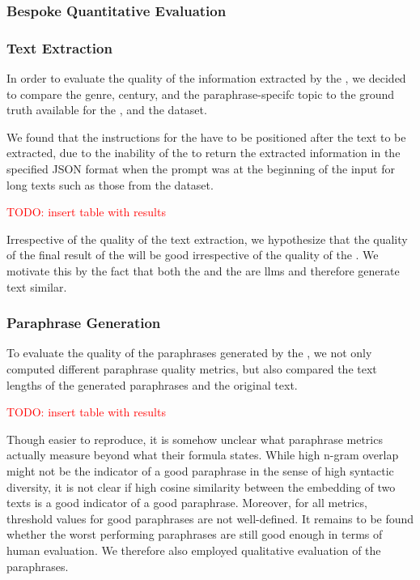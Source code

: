 

\subsubsection{Bespoke Quantitative Evaluation}
\label{subsec:custom_quantitative_evaluation}

\subsubsection{Text Extraction}
\label{subsec:text_extraction}

In order to evaluate the quality of the information extracted by the \pextractor{}, 
we decided to compare the genre, century, and the paraphrase-specifc topic to the 
ground truth available for the \dataBlog{}, \dataGutenberg{} and the \dataCustom{} dataset.

We found that the instructions for the \pextractor{} have to be positioned after the text to be extracted, 
due to the inability of the \pextractor{} to return the extracted information in the specified JSON format 
when the prompt was at the beginning of the input for long texts such as those from the \dataGutenberg{} dataset.

\textcolor{red}{TODO: insert table with results}

Irrespective of the quality of the text extraction, we hypothesize that the quality of the final result of the \pgenerator{} will be good irrespective of the quality of the \pextractor{}.
We motivate this by the fact that both the \pextractor{} and the \pgenerator{} are \acp{llm} and therefore generate text similar.

\subsubsection{Paraphrase Generation}
\label{subsec:paraphrase_generation}
To evaluate the quality of the paraphrases generated by the \pgenerator{}, 
we not only computed different paraphrase quality metrics, 
but also compared the text lengths of the generated paraphrases and the original text.

\textcolor{red}{TODO: insert table with results}

Though easier to reproduce, it is somehow unclear what paraphrase metrics actually measure beyond what their formula states.
While high n-gram overlap might not be the indicator of a good paraphrase in the sense of high syntactic diversity, 
it is not clear if high cosine similarity between the embedding of two texts is a good indicator of a good paraphrase.
Moreover, for all metrics, threshold values for good paraphrases are not well-defined.
It remains to be found whether the worst performing paraphrases are still good enough in terms of human evaluation.
We therefore also employed qualitative evaluation of the paraphrases.

